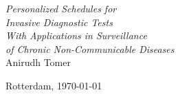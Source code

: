 \begin{titlingpage} 

\raggedleft
\vspace*{\baselineskip}
{\Huge\itshape Personalized Schedules for\\ Invasive Diagnostic Tests}\\[\baselineskip]
{\large\itshape With Applications in Surveillance \\of Chronic Non-Communicable Diseases}\\[0.2\textheight]
{\Large Anirudh Tomer}\par
\vfill
{\Large Rotterdam, \today}
\vspace*{\baselineskip}
\end{titlingpage}